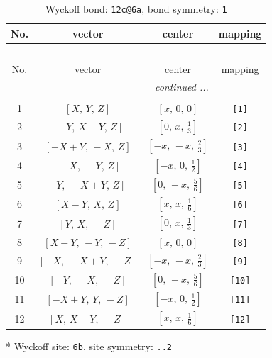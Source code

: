 \documentclass[fleqn,8pt]{jsarticle}
\begin{document}
\begin{longtable}{cccc}
\caption{Wyckoff bond: {\tt 12c@6a}, bond symmetry: {\tt 1}}
 \\
 \hline \hline
No. & vector & center & mapping \\ \hline \endfirsthead

\multicolumn{3}{l}{\tablename\ \thetable{}} \\
 \hline \hline
No. & vector & center & mapping \\ \hline \endhead

 \hline \hline
\multicolumn{3}{r}{\footnotesize\it continued ...} \\ \endfoot

 \hline \hline
\multicolumn{3}{r}{} \\ \endlastfoot

1 & $\left[ X,\, Y,\, Z \right]$ & $\left[ x,\, 0,\, 0 \right]$ & {\tt [1]} \\ \hline
2 & $\left[ - Y,\, X - Y,\, Z \right]$ & $\left[ 0,\, x,\, \frac{1}{3} \right]$ & {\tt [2]} \\ \hline
3 & $\left[ - X + Y,\, - X,\, Z \right]$ & $\left[ - x,\, - x,\, \frac{2}{3} \right]$ & {\tt [3]} \\ \hline
4 & $\left[ - X,\, - Y,\, Z \right]$ & $\left[ - x,\, 0,\, \frac{1}{2} \right]$ & {\tt [4]} \\ \hline
5 & $\left[ Y,\, - X + Y,\, Z \right]$ & $\left[ 0,\, - x,\, \frac{5}{6} \right]$ & {\tt [5]} \\ \hline
6 & $\left[ X - Y,\, X,\, Z \right]$ & $\left[ x,\, x,\, \frac{1}{6} \right]$ & {\tt [6]} \\ \hline
7 & $\left[ Y,\, X,\, - Z \right]$ & $\left[ 0,\, x,\, \frac{1}{3} \right]$ & {\tt [7]} \\ \hline
8 & $\left[ X - Y,\, - Y,\, - Z \right]$ & $\left[ x,\, 0,\, 0 \right]$ & {\tt [8]} \\ \hline
9 & $\left[ - X,\, - X + Y,\, - Z \right]$ & $\left[ - x,\, - x,\, \frac{2}{3} \right]$ & {\tt [9]} \\ \hline
10 & $\left[ - Y,\, - X,\, - Z \right]$ & $\left[ 0,\, - x,\, \frac{5}{6} \right]$ & {\tt [10]} \\ \hline
11 & $\left[ - X + Y,\, Y,\, - Z \right]$ & $\left[ - x,\, 0,\, \frac{1}{2} \right]$ & {\tt [11]} \\ \hline
12 & $\left[ X,\, X - Y,\, - Z \right]$ & $\left[ x,\, x,\, \frac{1}{6} \right]$ & {\tt [12]} \\
\end{longtable}
* Wyckoff site: {\tt 6b}, site symmetry: {\tt ..2}
\end{document}
